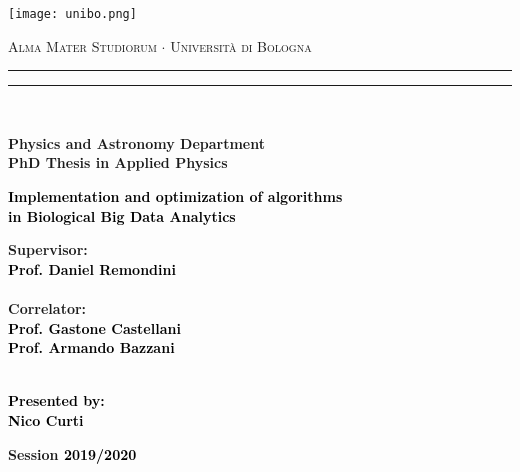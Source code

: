 \documentclass{standalone}
\begin{document}
\begin{titlepage}

\centering
\texttt{[image: unibo.png]}

\begin{center}
{{\Large{\textsc{Alma Mater Studiorum $\cdot$ Universit\`a di Bologna}}}}
\rule[0.1cm]{15.8cm}{0.1mm}
\rule[0.5cm]{15.8cm}{0.6mm}
\\\vspace{3mm}

{\small{\bf Physics and Astronomy Department\\PhD Thesis in Applied Physics}}

\end{center}

\vspace{23mm}

\begin{center}\textcolor{black}{
{\Large{\bf Implementation and optimization of algorithms\\in Biological Big Data Analytics}}\\
}\end{center}

\vspace{40mm} \par \noindent

\begin{minipage}[t]{\textwidth}
{\large{\bf Supervisor: \vspace{2mm}\\\textcolor{black}{
Prof. Daniel Remondini}}}\\\\
{\large{\bf Correlator: \vspace{2mm}\\\textcolor{black}{
Prof. Gastone Castellani\\
Prof. Armando Bazzani}}}\\\\
\end{minipage}


\hfill

\begin{minipage}[t]{\textwidth}\raggedleft \textcolor{black}{
{\large{\bf Presented by:
\vspace{2mm}\\
Nico Curti}}}
\end{minipage}

\vspace{17mm}

\begin{center}
{\large{\bf Session \textcolor{black}{2019/2020}
}}
\end{center}

\end{titlepage}
\end{document}
